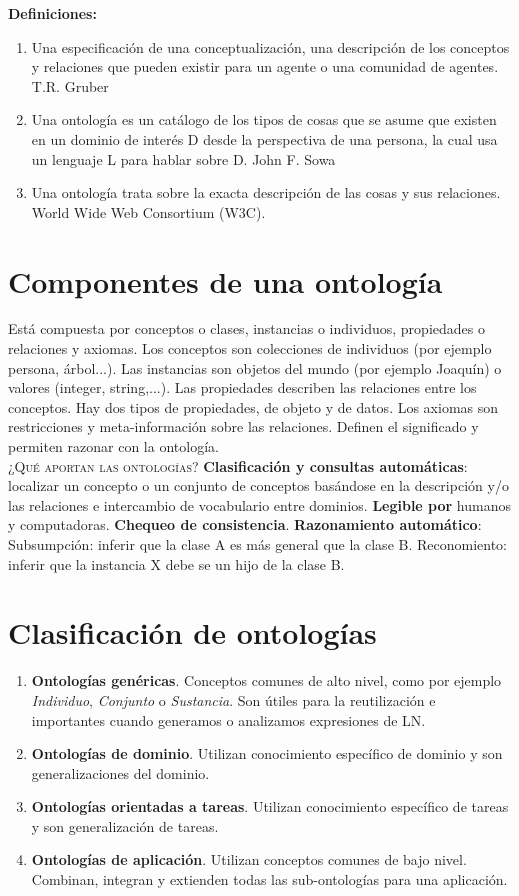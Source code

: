 \documentclass[12pt]{article}
\begin{document}
\textbf{Definiciones:}
\begin{enumerate}
\item Una especificación de una conceptualización, una descripción de los conceptos y relaciones que pueden existir para un agente o una comunidad de agentes. T.R. Gruber
\item Una ontología es un catálogo de los tipos de cosas que se asume que existen en un dominio de interés D desde la perspectiva de una persona, la cual usa un lenguaje L para hablar sobre D. John F. Sowa
\item Una ontología trata sobre la exacta descripción de las cosas y sus relaciones. World Wide Web Consortium (W3C).
\end{enumerate}

\section{Componentes de una ontología}
Está compuesta por conceptos o clases, instancias o individuos, propiedades o relaciones y axiomas. Los conceptos son colecciones de individuos (por ejemplo persona, árbol...). Las instancias son objetos del mundo (por ejemplo Joaquín) o valores (integer, string,...). Las propiedades describen las relaciones entre los conceptos. Hay dos tipos de propiedades, de objeto y de datos. Los axiomas son restricciones y meta-información sobre las relaciones. Definen el significado y permiten razonar con la ontología.\\

\textsc{¿Qué aportan las ontologías?}
\textbf{Clasificación y consultas automáticas}: localizar un concepto o un conjunto de conceptos basándose en la descripción y/o las relaciones e intercambio de vocabulario entre dominios. \textbf{Legible por} humanos y computadoras. \textbf{Chequeo de consistencia}. \textbf{Razonamiento automático}: Subsumpción: inferir que la clase A es más general que la clase B. Reconomiento: inferir que la instancia X debe se un hijo de la clase B.

\section{Clasificación de ontologías}
\begin{enumerate}
\item \textbf{Ontologías genéricas}. Conceptos comunes de alto nivel, como por ejemplo \textit{Individuo}, \textit{Conjunto} o \textit{Sustancia}. Son útiles para la reutilización e importantes cuando generamos o analizamos expresiones de LN.
\item \textbf{Ontologías de dominio}. Utilizan conocimiento específico de dominio y son generalizaciones del dominio.
\item \textbf{Ontologías orientadas a tareas}. Utilizan conocimiento específico de tareas y son generalización de tareas.
\item \textbf{Ontologías de aplicación}. Utilizan conceptos comunes de bajo nivel. Combinan, integran y extienden todas las sub-ontologías para una aplicación.
\end{enumerate}
\end{document}
